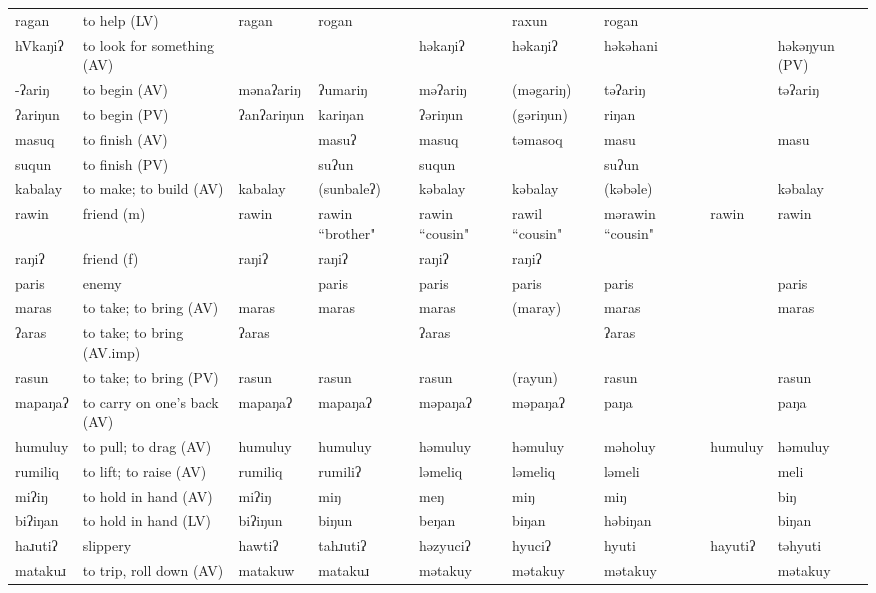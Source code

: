 \begin{landscape}
\begin{longtable}{*{9}{>{\raggedright\arraybackslash}p{}}}
\text{*}ragan & to help (LV) & ragan & rogan &  & raxun & rogan &  & \\
\text{*}hVkaŋiʔ & to look for something (AV) &  &  & həkaŋiʔ & həkaŋiʔ & həkəhani &  & həkəŋyun (PV)\\
\text{*}-ʔariŋ & to begin (AV) & mənaʔariŋ & ʔumariŋ & məʔariŋ & (məgariŋ) & təʔariŋ &  & təʔariŋ\\
\text{*}ʔariŋun & to begin (PV) & ʔanʔariŋun & kariŋan & ʔəriŋun & (gəriŋun) & riŋan &  & \\
\text{*}masuq & to finish (AV) &  & masuʔ & masuq & təmasoq & masu &  & masu\\
\text{*}suqun & to finish (PV) &  & suʔun & suqun &  & suʔun &  & \\
\text{*}kabalay & to make; to build (AV) & kabalay & (sunbaleʔ) & kəbalay & kəbalay & (kəbəle) &  & kəbalay\\
\text{*}rawin & friend (m) & rawin & rawin ``brother" & rawin ``cousin" & rawil ``cousin" & mərawin ``cousin" & rawin & rawin\\
\text{*}raŋiʔ & friend (f) & raŋiʔ & raŋiʔ & raŋiʔ & raŋiʔ &  &  & \\
\text{*}paris & enemy &  & paris & paris & paris & paris &  & paris\\
\text{*}maras & to take; to bring (AV) & maras & maras & maras & (maray) & maras &  & maras\\
\text{*}ʔaras & to take; to bring (AV.imp) & ʔaras &  & ʔaras &  & ʔaras &  & \\
\text{*}rasun & to take; to bring (PV) & rasun & rasun & rasun & (rayun) & rasun &  & rasun\\
\text{*}mapaŋaʔ & to carry on one's back (AV) & mapaŋaʔ & mapaŋaʔ & məpaŋaʔ & məpaŋaʔ & paŋa &  & paŋa\\
\text{*}humuluy & to pull; to drag (AV) & humuluy & humuluy & həmuluy & həmuluy & məholuy & humuluy & həmuluy\\
\text{*}rumiliq & to lift; to raise (AV) & rumiliq & rumiliʔ & ləmeliq & ləmeliq & ləmeli &  & meli\\
\text{*}miʔiŋ & to hold in hand (AV) & miʔiŋ & miŋ & meŋ & miŋ & miŋ &  & biŋ\\
\text{*}biʔiŋan & to hold in hand (LV) & biʔiŋun & biŋun & beŋan & biŋan & həbiŋan &  & biŋan\\
\text{*}haɹutiʔ & slippery & hawtiʔ & tahɹutiʔ & həzyuciʔ & hyuciʔ & hyuti & hayutiʔ & təhyuti\\
\text{*}matakuɹ & to trip, roll down (AV) & matakuw & matakuɹ & mətakuy & mətakuy & mətakuy &  & mətakuy\\

\end{longtable}
\end{landscape}
